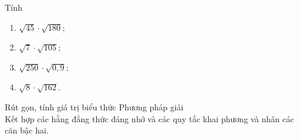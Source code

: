 \begin{vd}
    Tính
    \begin{multicols}{2}
    	\begin{enumerate}
    		\item $\sqrt{45}\cdot \sqrt{180}$;
    		\item $\sqrt{7}\cdot \sqrt{105}$;
    		\item $\sqrt{250}\cdot \sqrt{0,9}$;
    		\item $\sqrt{8}\cdot \sqrt{162}$.
    	\end{enumerate}
    \end{multicols}
\end{vd}

\begin{dang}{Rút gọn, tính giá trị biểu thức}
	Phương pháp giải\\
	Kết hợp các hằng đẳng thức đáng nhớ và các quy tắc khai phương và nhân các căn bậc hai.
\end{dang}


